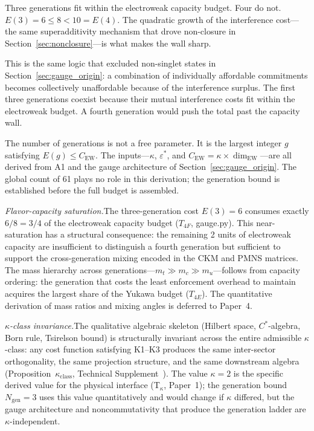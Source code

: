 \documentclass[11pt]{article}
\begin{document}
Three generations fit within the electroweak capacity budget.  Four do not.  $E(3) = 6 \le 8 < 10 = E(4)$.  The quadratic growth of the interference cost---the same superadditivity mechanism that drove non-closure in Section~\ref{sec:nonclosure}---is what makes the wall sharp.

This is the same logic that excluded non-singlet states in Section~\ref{sec:gauge_origin}: a combination of individually affordable commitments becomes collectively unaffordable because of the interference surplus.  The first three generations coexist because their mutual interference costs fit within the electroweak budget.  A fourth generation would push the total past the capacity wall.

The number of generations is not a free parameter.  It is the largest integer $g$ satisfying $E(g) \le C_{\mathrm{EW}}$.  The inputs---$\kappa$, $\varepsilon^*$, and $C_{\mathrm{EW}} = \kappa \times \dim_{\mathrm{EW}}$---are all derived from A1 and the gauge architecture of Section~\ref{sec:gauge_origin}.  The global count of 61 plays no role in this derivation; the generation bound is established before the full budget is assembled.

\smallskip
\noindent\textit{Flavor-capacity saturation.}\quad The three-generation cost $E(3) = 6$ consumes exactly $6/8 = 3/4$ of the electroweak capacity budget ($T_{4F}$, gauge.py).  This near-saturation has a structural consequence: the remaining 2 units of electroweak capacity are insufficient to distinguish a fourth generation but sufficient to support the cross-generation mixing encoded in the CKM and PMNS matrices.  The mass hierarchy across generations---$m_t \gg m_c \gg m_u$---follows from capacity ordering: the generation that costs the least enforcement overhead to maintain acquires the largest share of the Yukawa budget ($T_{4E}$).  The quantitative derivation of mass ratios and mixing angles is deferred to Paper~4.

\smallskip
\noindent\textit{$\kappa$-class invariance.}\quad The qualitative algebraic skeleton (Hilbert space, $C^*$-algebra, Born rule, Tsirelson bound) is structurally invariant across the entire admissible $\kappa$-class: any cost function satisfying K1--K3 produces the same inter-sector orthogonality, the same projection structure, and the same downstream algebra (Proposition~$\kappa_{\mathrm{class}}$, Technical Supplement~\cite{BrookeSupplement}).  The value $\kappa = 2$ is the specific derived value for the physical interface (T$_\kappa$, Paper~1); the generation bound $N_{\mathrm{gen}} = 3$ uses this value quantitatively and would change if $\kappa$ differed, but the gauge architecture and noncommutativity that produce the generation ladder are $\kappa$-independent.
\end{document}
